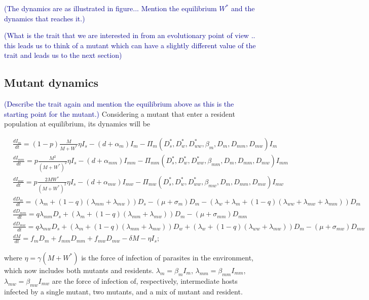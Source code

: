 \documentclass{article}
\newcommand{\cha}[1]{\textcolor{darkblue}{(#1)}}
\begin{document}
\cha{The dynamics are as illustrated in figure...
Mention the equilibrium $W^{*}$ and the dynamics that reaches it.}

\cha{What is the trait that we are interested in from an evolutionary point of view .. this leads us to think of a mutant which can have a slightly different value of the trait and leads us to the next section}

\subsection{Mutant dynamics}

\cha{Describe the trait again and mention the equilibrium above as this is the starting point for the mutant.}
Considering a mutant that enter a resident population at equilibrium, its dynamics will be

\begin{subequations}
\begin{align}
& \frac{dI_m}{dt} = (1 - p) \frac{M}{M + W^*} \eta I_s - (d + \alpha_m) I_m -\Pi_m(D_s^*, D_w^*,  D_{ww}^*,  \beta_m, D_m, D_{mm}, D_{mw}) I_m \\
& \frac{dI_{mm}}{dt} = p \frac{M^2}{(M + W^*)^2} \eta I_s - (d + \alpha_{mm}) I_{mm} - \Pi_{mm}(D_s^*, D_w^*, D_{ww}^*, \beta_{mm}, D_m, D_{mm}, D_{mw}) I_{mm}\\
& \frac{dI_{mw}}{dt} =  p \frac{2 M W^*}{(M + W^*)^2} \eta I_s - (d + \alpha_{mw}) I_{mw} -\Pi_{mw}(D_s^*, D_w^*, D_{ww}^*, \beta_{mw}, D_m, D_{mm}, D_{mw}) I_{mw} \\
& \frac{dD_m}{dt} = ( \lambda_m + (1 - q) (\lambda_{mm} + \lambda_{mw})) D_s - (\mu + \sigma_m) D_m - (\lambda_w + \lambda_m + (1 - q) (\lambda_{ww} + \lambda_{mw} + \lambda_{mm}) ) D_m \\
& \frac{dD_{mm}}{dt} = q \lambda_{mm} D_s + (\lambda_m + (1 - q)(\lambda_{mm} + \lambda_{mw})) D_m - (\mu + \sigma_{mm}) D_{mm} \\
& \frac{dD_{mw}}{dt} = q \lambda_{mw} D_s + (\lambda_m + (1 - q)(\lambda_{mm} + \lambda_{mw})) D_w + (\lambda_w + (1 - q) (\lambda_{ww} + \lambda_{mw})) D_m - (\mu + \sigma_{mw}) D_{mw} \\
& \frac{dM}{dt} = f_m D_m + f_{mm} D_{mm} +  f_{mw} D_{mw} - \delta M - \eta I_s;
\end{align}
\label{odes:mutdynamics}
\end{subequations}

where $\eta =\gamma (M + W^*)$ is the force of infection of parasites in the environment, which now includes both mutants and residents. $\lambda_m = \beta_m I_m$, $\lambda_{mm} = \beta_{mm} I_{mm}$, $\lambda_{mw} = \beta_{mw} I_{mw}$ are the force of infection of, respectively, intermediate hosts infected by a single mutant, two mutants, and a mix of mutant and resident. 
\end{document}
